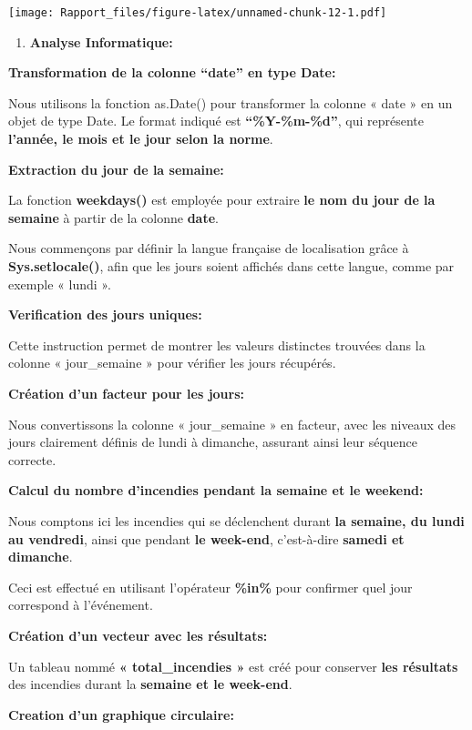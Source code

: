 \documentclass[
]{article}
\providecommand{\tightlist}{%
  \setlength{\itemsep}{0pt}\setlength{\parskip}{0pt}}
\begin{document}
\texttt{[image: Rapport\_files/figure-latex/unnamed-chunk-12-1.pdf]}

\begin{enumerate}
\def\labelenumi{\arabic{enumi}.}
\tightlist
\item
  \textbf{Analyse Informatique:}
\end{enumerate}

\textbf{Transformation de la colonne ``date'' en type Date:}

Nous utilisons la fonction as.Date() pour transformer la colonne « date
» en un objet de type Date. Le format indiqué est
\textbf{``\%Y-\%m-\%d''}, qui représente \textbf{l'année, le mois et le
jour selon la norme}.

\textbf{Extraction du jour de la semaine:}

La fonction \textbf{weekdays()} est employée pour extraire \textbf{le
nom du jour de la semaine} à partir de la colonne \textbf{date}.

Nous commençons par définir la langue française de localisation grâce à
\textbf{Sys.setlocale()}, afin que les jours soient affichés dans cette
langue, comme par exemple « lundi ».

\textbf{Verification des jours uniques:}

Cette instruction permet de montrer les valeurs distinctes trouvées dans
la colonne « jour\_semaine » pour vérifier les jours récupérés.

\textbf{Création d'un facteur pour les jours:}

Nous convertissons la colonne « jour\_semaine » en facteur, avec les
niveaux des jours clairement définis de lundi à dimanche, assurant ainsi
leur séquence correcte.

\textbf{Calcul du nombre d'incendies pendant la semaine et le weekend:}

Nous comptons ici les incendies qui se déclenchent durant \textbf{la
semaine, du lundi au vendredi}, ainsi que pendant \textbf{le week-end},
c'est-à-dire \textbf{samedi et dimanche}.

Ceci est effectué en utilisant l'opérateur \textbf{\%in\%} pour
confirmer quel jour correspond à l'événement.

\textbf{Création d'un vecteur avec les résultats:}

Un tableau nommé \textbf{« total\_incendies »} est créé pour conserver
\textbf{les résultats} des incendies durant la \textbf{semaine et le
week-end}.

\textbf{Creation d'un graphique circulaire:}
\end{document}
